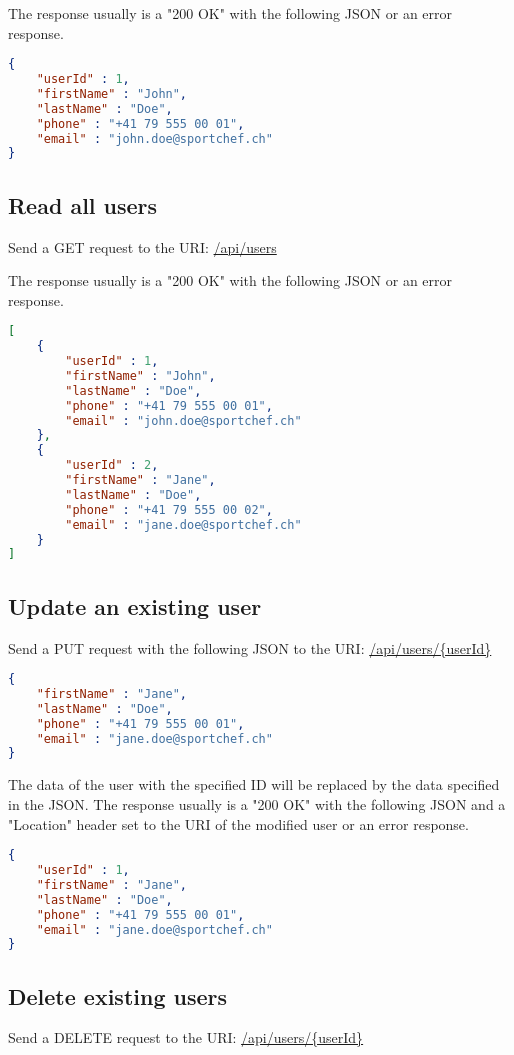 \documentclass[a4paper,openright,twoside]{report}
\begin{document}
The response usually is a "200 OK" with the following JSON or an error response.

\begin{lstlisting}[language=json]
{
	"userId" : 1,
	"firstName" : "John",
	"lastName" : "Doe",
	"phone" : "+41 79 555 00 01",
	"email" : "john.doe@sportchef.ch"
}
\end{lstlisting}

\subsection{Read all users}
Send a GET request to the URI: \url{/api/users}

The response usually is a "200 OK" with the following JSON or an error response.

\begin{lstlisting}[language=json]
[
	{
		"userId" : 1,
		"firstName" : "John",
		"lastName" : "Doe",
		"phone" : "+41 79 555 00 01",
		"email" : "john.doe@sportchef.ch"
	},
	{
		"userId" : 2,
		"firstName" : "Jane",
		"lastName" : "Doe",
		"phone" : "+41 79 555 00 02",
		"email" : "jane.doe@sportchef.ch"
	}
]
\end{lstlisting}

\subsection{Update an existing user}
Send a PUT request with the following JSON to the URI: \url{/api/users/{userId}}

\begin{lstlisting}[language=json]
{
	"firstName" : "Jane",
	"lastName" : "Doe",
	"phone" : "+41 79 555 00 01",
	"email" : "jane.doe@sportchef.ch"
}
\end{lstlisting}

The data of the user with the specified ID will be replaced by the data specified in the JSON. The response usually is a "200 OK" with the following JSON and a "Location" header set to the URI of the modified user or an error response.

\begin{lstlisting}[language=json]
{
	"userId" : 1,
	"firstName" : "Jane",
	"lastName" : "Doe",
	"phone" : "+41 79 555 00 01",
	"email" : "jane.doe@sportchef.ch"
}
\end{lstlisting}

\subsection{Delete existing users}
Send a DELETE request to the URI: \url{/api/users/{userId}}
\end{document}
